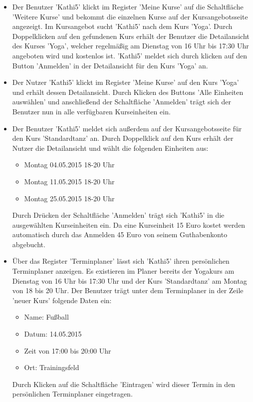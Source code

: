 \documentclass[a4paper]{scrreprt}
\begin{document}
			\begin{itemize}
				\item {} 
				Der Benutzer 'Kathi5' klickt im Register 'Meine Kurse' auf die Schaltfläche 'Weitere Kurse' und bekommt die einzelnen Kurse auf der Kursangebotsseite angezeigt. Im Kursangebot sucht 'Kathi5' nach dem Kurs 'Yoga'. Durch Doppelklicken auf den gefundenen Kurs erhält der Benutzer die Detailansicht des Kurses 'Yoga', welcher regelmäßig am Dienstag von 16 Uhr bis 17:30 Uhr angeboten wird und kostenlos ist. 'Kathi5' meldet sich durch klicken auf den Button 'Anmelden' in der Detailansicht für den Kurs 'Yoga' an.	
				
				\item {} 
				Der Nutzer 'Kathi5'	klickt im Register 'Meine Kurse' auf den Kurs 'Yoga' und erhält dessen Detailansicht. Durch Klicken des Buttons 'Alle Einheiten auswählen' und anschließend der Schaltfläche 'Anmelden' trägt sich der Benutzer nun in alle verfügbaren Kurseinheiten ein.
				
				\item {}
				Der Benutzer 'Kathi5' meldet sich außerdem auf der Kursangebotsseite für den Kurs 'Standardtanz' an. Durch Doppelklick auf den Kurs erhält der Nutzer die Detailansicht und wählt die folgenden Einheiten aus:
					\begin{itemize}
						\item Montag 04.05.2015 18-20 Uhr
						\item Montag 11.05.2015 18-20 Uhr
						\item Montag 25.05.2015 18-20 Uhr		
					\end{itemize}	
				Durch Drücken der Schaltfläche 'Anmelden' trägt sich 'Kathi5' in die ausgewählten Kurseinheiten ein. Da eine Kurseinheit 15 Euro kostet werden automatisch durch das Anmelden 45 Euro von seinem Guthabenkonto abgebucht.
				
				\item {}
				Über das Register 'Terminplaner' lässt sich 'Kathi5' ihren persönlichen Terminplaner anzeigen. Es existieren im Planer bereits der Yogakurs am Dienstag von 16 Uhr bis 17:30 Uhr und der Kurs 'Standardtanz' am Montag von 18 bis 20 Uhr. Der Benutzer trägt unter dem Terminplaner in der Zeile 'neuer Kurs' folgende Daten ein:
					\begin{itemize}
						\item Name: Fußball
						\item Datum: 14.05.2015
						\item Zeit von 17:00 bis 20:00 Uhr
						\item Ort: Trainingsfeld		
					\end{itemize}
				Durch Klicken auf die Schaltfläche 'Eintragen' wird dieser Termin in den persönlichen Terminplaner eingetragen.
				

\end{itemize}
\end{document}
